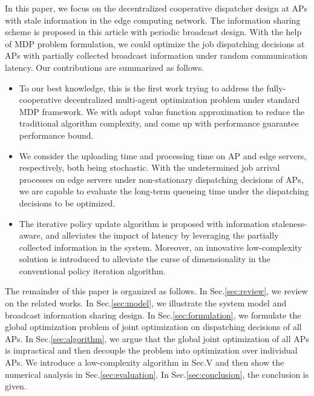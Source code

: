 In this paper, we focus on the decentralized cooperative dispatcher design at APs with stale information in the edge computing network.
The information sharing scheme is proposed in this article with periodic broadcast design.
With the help of MDP problem formulation, we could optimize the job dispatching decisions at APs with partially collected broadcast information under random communication latency.
Our contributions are summarized as follows.
\begin{itemize}
    \item To our best knowledge, this is the first work trying to address the fully-cooperative decentralized multi-agent optimization problem under standard MDP framework.
    We with adopt value function approximation to reduce the traditional algorithm complexity, and come up with performance guarantee performance bound.

    \item We consider the uploading time and processing time on AP and edge servers, respectively, both being stochastic.
    With the undetermined job arrival processes on edge servers under non-stationary dispatching decisions of APs, we are capable to evaluate the long-term queueing time under the dispatching decisions to be optimized.

    \item The iterative policy update algorithm is proposed with information staleness-aware, and alleviates the impact of latency by leveraging the partially collected information in the system.
    Moreover, an innovative low-complexity solution is introduced to alleviate the curse of dimensionality in the conventional policy iteration algorithm.
\end{itemize}

The remainder of this paper is organized as follows.
In Sec.\ref{sec:review}, we review on the related works.
In Sec.\ref{sec:model}, we illustrate the system model and broadcast information sharing design.
In Sec.\ref{sec:formulation}, we formulate the global optimization problem of joint optimization on dispatching decisions of all APs.
In Sec.\ref{sec:algorithm}, we argue that the global joint optimization of all APs is impractical and then decouple the problem into optimization over individual APs.
We introduce a low-complexity algorithm in Sec.V and then show the numerical analysis in Sec.\ref{sec:evaluation}.
In Sec.\ref{sec:conclusion}, the conclusion is given.

